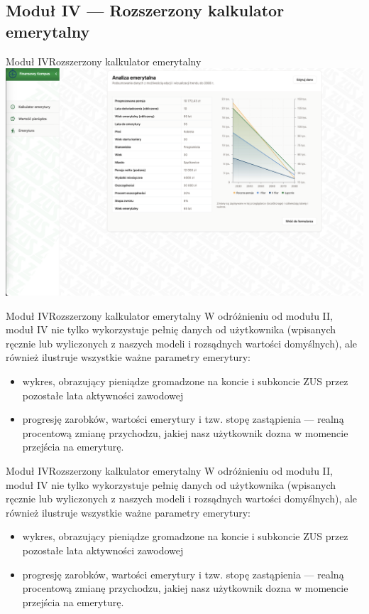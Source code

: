 \subsection{Moduł IV --- Rozszerzony kalkulator emerytalny}

\begin{frame}[t]{Moduł IV}{Rozszerzony kalkulator emerytalny}
\includegraphics[width=.8\textwidth]{img/module_4_extended_pension_calculator}
\end{frame}

\begin{frame}[t]{Moduł IV}{Rozszerzony kalkulator emerytalny}
W odróżnieniu od modułu II, moduł IV nie tylko wykorzystuje pełnię danych od użytkownika
(wpisanych ręcznie lub wyliczonych z naszych modeli i rozsądnych wartości domyślnych),
ale również ilustruje wszystkie ważne parametry emerytury:

\begin{itemize}
    \pause
    \item wykres, obrazujący pieniądze gromadzone na koncie i subkoncie ZUS przez pozostałe lata aktywności
    zawodowej
    \pause
    \item progresję zarobków, wartości emerytury i tzw. stopę zastąpienia --- realną procentową zmianę
    przychodzu, jakiej nasz użytkownik dozna w momencie przejścia na emeryturę.
\end{itemize}
\end{frame}

\begin{frame}[t]{Moduł IV}{Rozszerzony kalkulator emerytalny}
W odróżnieniu od modułu II, moduł IV nie tylko wykorzystuje pełnię danych od użytkownika
(wpisanych ręcznie lub wyliczonych z naszych modeli i rozsądnych wartości domyślnych),
ale również ilustruje wszystkie ważne parametry emerytury:

\begin{itemize}
    \pause
    \item wykres, obrazujący pieniądze gromadzone na koncie i subkoncie ZUS przez pozostałe lata aktywności
    zawodowej
    \pause
    \item progresję zarobków, wartości emerytury i tzw. stopę zastąpienia --- realną procentową zmianę
    przychodzu, jakiej nasz użytkownik dozna w momencie przejścia na emeryturę.
\end{itemize}
\end{frame}


